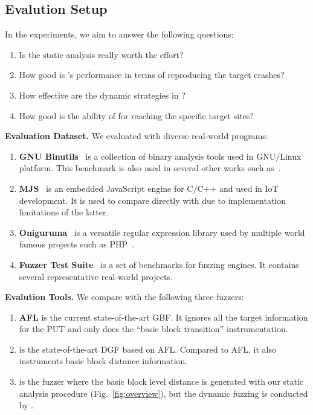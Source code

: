 \subsection{Evalution Setup}\label{subsec:evalsetup}

In the experiments, we aim to answer the following questions:

\begin{enumerate}[\textbf{RQ}1]
    \item  Is the static analysis really worth the effort?
    \item  How good is {\dFOT}'s performance in terms of reproducing the target crashes?
    \item  How effective are the dynamic strategies in {\dFOT}?
    \item  How good is the ability of {\dFOT} for reaching the specific target sites?  
\end{enumerate}

\textbf{Evaluation Dataset.}
We evaluated \dFOT with diverse real-world programs:
\begin{enumerate}[(1)] 
    \item \textbf{GNU Binutils}~\cite{binutils} is a collection of binary analysis tools used in GNU/Linux platform. 
This benchmark is also used in several other works such as~\cite{Bohme:2016:CGF, Bohme:2017:DGF, FairFuzz}.
    \item \textbf{MJS}~\cite{mjs} is an embedded JavaScript engine for C/C++ and used in IoT development.
    It is used to compare \dFOT directly with {\aflgo} due to implementation limitations of the latter.
    \item \textbf{Oniguruma}~\cite{oniguruma} is a versatile regular expression library used by multiple world famous projects such as PHP~\cite{php}.
    \item \textbf{Fuzzer Test Suite}~\cite{fuzzer-test-suite} is a set of benchmarks for fuzzing engines.
    It contains several representative real-world projects.
\end{enumerate}

\textbf{Evalution Tools.} We compare {\dFOT} with the following three fuzzers:
\begin{enumerate}[(1)] 
\item \textbf{AFL} is the current state-of-the-art GBF. It ignores all the target information for the PUT and only does the ``basic block transition'' instrumentation.
\item \textbf{{\aflgo}} is the state-of-the-art DGF based on AFL.
Compared to AFL, it also instruments basic block distance information.
\item \textbf{{\dGO}} is the fuzzer where the basic block level distance is generated with our static analysis procedure (Fig.~\ref{fig:overview}), but the dynamic fuzzing is conducted by {\aflgo}.
\end{enumerate}

